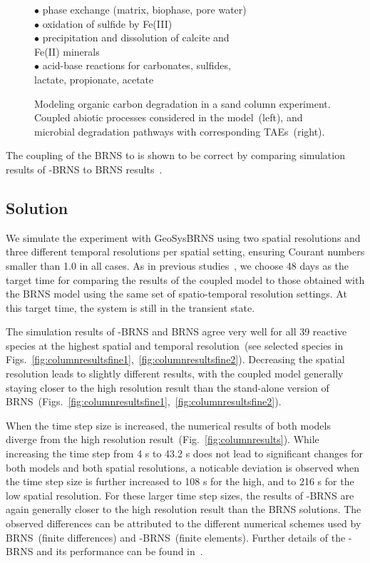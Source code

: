 \begin{figure}[htb]
$\bullet$ phase exchange (matrix, biophase, pore water)\\
$\bullet$ oxidation of sulfide by Fe(III)\\
$\bullet$ precipitation and dissolution of calcite and\\
Fe(II) minerals\\
$\bullet$ acid-base reactions for carbonates, sulfides,\\
lactate, propionate, acetate

\vspace{-2.75cm}
\hspace{8cm}
\caption{
Modeling organic carbon degradation in a sand column experiment.  Coupled
abiotic processes considered in the model~(left), and microbial degradation
pathways with corresponding TAEs~(right).
}
\label{fig:sandnetwork}
\end{figure}

The coupling of the BRNS to \GeoSys is shown to be correct by comparing
simulation results of \GeoSys-BRNS to BRNS results~\cite{Centler2009}.

\subsection{Solution}

We simulate the experiment with GeoSysBRNS using two spatial resolutions and
three different temporal resolutions per spatial setting, ensuring Courant
numbers smaller than 1.0 in all cases.  As in previous
studies~\cite{Thullner2005,Schaefer1998b}, we choose 48 days as the target
time for comparing the results of the coupled model to those obtained with the
BRNS model using the same set of spatio-temporal resolution settings.  At this
target time, the system is still in the transient state. 

The simulation results of \GeoSys-BRNS and BRNS agree very well for all 39
reactive species at the highest spatial and temporal resolution~(see selected
species in Figs.~\ref{fig:columnresultsfine1},~\ref{fig:columnresultsfine2}).
Decreasing the spatial resolution leads to slightly different results, with the
coupled model generally staying closer to the high resolution result than the
stand-alone version of BRNS~(Figs.~\ref{fig:columnresultsfine1},~\ref{fig:columnresultsfine2}).

When the time step size is increased, the numerical results of both models
diverge from the high resolution result~(Fig.~\ref{fig:columnresults}).  While
increasing the time step from 4 s to 43.2 s does not lead to significant
changes for both models and both spatial resolutions, a noticable deviation is
observed when the time step size is further increased to 108 s for the high,
and to 216 s for the low spatial resolution.  For these larger time step sizes,
the results of \GeoSys-BRNS are again generally closer to the high resolution
result than the BRNS solutions.  The observed differences can be attributed to
the different numerical schemes used by BRNS~(finite differences) and
\GeoSys-BRNS~(finite elements). Further details of the \GeoSys-BRNS and its
performance can be found in~\cite{Centler2009}.


